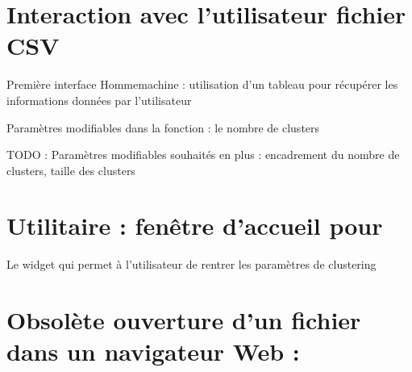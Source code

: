\documentclass[letterpaper,10pt,french]{sphinxmanual}
\begin{document}
\section{Interaction avec l’utilisateur  fichier CSV}
\label{\detokenize{index:module-src.ihm.ihm_csv}}\label{\detokenize{index:interaction-avec-l-utilisateur-via-fichier-csv}}
\sphinxAtStartPar
Première interface Homme\sphinxhyphen{}machine : utilisation d’un tableau  pour récupérer les informations données par l’utilisateur

\sphinxAtStartPar
Paramètres modifiables dans la fonction  : le nombre de clusters

\sphinxAtStartPar
TODO : Paramètres modifiables souhaités en plus : encadrement du nombre de clusters, taille des clusters


\section{Utilitaire : fenêtre d’accueil pour }
\label{\detokenize{index:module-src.ihm.ihm_pyqt}}\label{\detokenize{index:utilitaire-fenetre-d-accueil-pour-ihm-complet}}

\begin{fulllineitems}
\label{\detokenize{index:src.ihm.ihm_pyqt.InputFenetre}}
\sphinxAtStartPar
Le widget qui permet à l’utilisateur de rentrer les paramètres de clustering

\end{fulllineitems}



\section{Obsolète ouverture d’un fichier  dans un navigateur Web :}
\label{\detokenize{index:obsolete-ouverture-d-un-fichier-html-dans-un-navigateur-web}}\label{\detokenize{index:module-src.ihm.web}}
\end{document}
